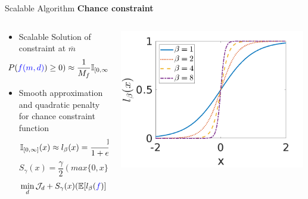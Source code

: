 \documentclass[10pt,xcolor=dvipsnames,compress]{beamer}
\begin{document}
\begin{frame}{ Scalable Algorithm}
\textbf{Chance constraint}
\begin{columns}
\begin{column}{0.45\textwidth}
\begin{itemize}
\small
\item \footnotesize{Scalable Solution of constraint at $\overline{m}$} %
\begin{equation*}
\footnotesize
    \hspace{-0.2in}P(\textcolor{blue}{f(m,d)})\geq 0) \approx \frac{1}{M_{f}} \mathbb{I}_{[0,\infty)}(T_{2}\textcolor{blue}{f(m_{i},d)}).
\end{equation*}
\item \footnotesize{Smooth approximation and quadratic penalty for chance constraint function\footnotemark}
\begin{equation*}
\footnotesize
    \mathbb{I}_{[0,\infty]}(x) \approx l_{\beta}(x) = \frac{1}{1 + e^{-2 \beta x}},  
\end{equation*}
\vspace{0.05in}
\begin{equation*}
    S_{\gamma}(x) = \frac{\gamma}{2}{(max{\{0,x\}})}^2
\end{equation*}
\vspace{0.05in}
\begin{equation*}
    \min_{{d}} \mathcal{J}_d + S_{\gamma}(x)(\mathbb{E}[l_{\beta}(\textcolor{blue}{f})] - \alpha_c)
\end{equation*}
\end{itemize}
\end{column}
\begin{column}{0.55\textwidth}
\centering
\includegraphics[trim={0.1in 0.1in 0.45in 0.2in},width=0.99\textwidth]{Figures/smooth.png}\\

\end{column}
\end{columns}
\end{frame}
\end{document}
